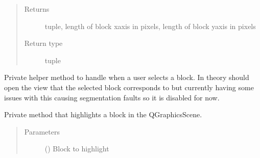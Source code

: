 \documentclass[letterpaper,10pt,english]{sphinxmanual}
\begin{document}
\begin{fulllineitems}
\begin{fulllineitems}
\begin{quote}
\begin{description}
\begin{itemize}
\end{itemize}

\item[{Returns}] \leavevmode
tuple, length of block x\sphinxhyphen{}axis in pixels,
length of block y\sphinxhyphen{}axis in pixels

\item[{Return type}] \leavevmode
tuple

\end{description}\end{quote}

\end{fulllineitems}


\begin{fulllineitems}
\label{\detokenize{polo.widgets:polo.widgets.plate_visualizer.PlateVisualizer._handle_block_selection}}
Private helper method to handle when a user selects a block.
In theory should open the view that the selected block corresponds
to but currently having some issues with this causing segmentation
faults so it is disabled for now.

\end{fulllineitems}


\begin{fulllineitems}
\label{\detokenize{polo.widgets:polo.widgets.plate_visualizer.PlateVisualizer._highlight_block}}
Private method that highlights a block in the
QGraphicsScene.
\begin{quote}\begin{description}
\item[{Parameters}] \leavevmode
{} () \textendash{} Block to highlight

\end{description}\end{quote}


\end{fulllineitems}
\end{fulllineitems}
\end{document}
